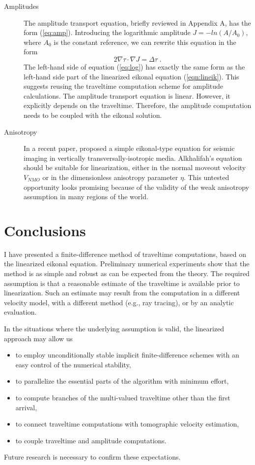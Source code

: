 \begin{description}
\item[Amplitudes] The amplitude transport equation, briefly reviewed
  in Appendix A, has the form (\ref{eq:amp}). Introducing the
  logarithmic amplitude $J = - ln (A/A_0)$, where $A_0$ is the
  constant reference, we can rewrite this equation in the form
  \begin{equation}
    \label{eq:log}
    2 \nabla \tau \cdot \nabla J = \Delta \tau\;.
  \end{equation}
  The left-hand side of equation (\ref{eq:log}) has exactly the same
  form as the left-hand side part of the linearized eikonal equation
  (\ref{eqn:lineik}). This suggests reusing the traveltime computation
  scheme for amplitude calculations. The amplitude transport equation
  is linear. However, it explicitly depends on the traveltime.
  Therefore, the amplitude computation needs to be coupled with the
  eikonal solution.
  
\item[Anisotropy] In a recent paper, \cite{tariq} proposed a
  simple eikonal-type equation for seismic imaging in vertically
  transversally-isotropic media. Alkhalifah's equation should be
  suitable for linearization, either in the normal moveout velocity
  $V_{NMO}$ or in the dimensionless anisotropy parameter $\eta$. This
  untested opportunity looks promising because of the validity of the
  weak anisotropy assumption in many regions of the world.

\end{description}

\section{Conclusions}

I have presented a finite-difference method of traveltime
computations, based on the linearized eikonal equation. Preliminary
numerical experiments show that the method is as simple and robust as
can be expected from the theory. The required assumption is that a
reasonable estimate of the traveltime is available prior to
linearization. Such an estimate may result from the computation in a
different velocity model, with a different method (e.g., ray tracing),
or by an analytic evaluation.
\par
In the situations where the underlying assumption is valid, the
linearized approach may allow us
\begin{itemize}
\item to employ unconditionally stable implicit finite-difference
  schemes with an easy control of the numerical stability,
\item to parallelize the essential parts of the algorithm with minimum
  effort,
\item to compute branches of the multi-valued traveltime other than
  the first arrival,
\item to connect traveltime computations with tomographic velocity
  estimation,
\item to couple traveltime and amplitude computations.
\end{itemize}
Future research is necessary to confirm these expectations.

